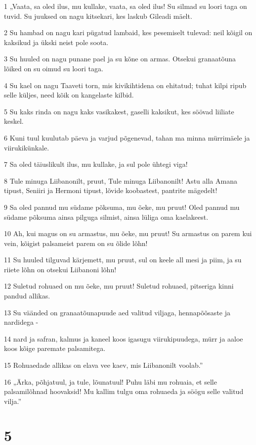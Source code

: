 \par 1 „Vaata, sa oled ilus, mu kullake, vaata, sa oled ilus! Su silmad su loori taga on tuvid. Su juuksed on nagu kitsekari, kes laskub Gileadi mäelt.
\par 2 Su hambad on nagu kari pügatud lambaid, kes pesemiselt tulevad: neil kõigil on kaksikud ja ükski neist pole soota.
\par 3 Su huuled on nagu punane pael ja su kõne on armas. Otsekui granaatõuna lõiked on su oimud su loori taga.
\par 4 Su kael on nagu Taaveti torn, mis kivikihtidena on ehitatud; tuhat kilpi ripub selle küljes, need kõik on kangelaste kilbid.
\par 5 Su kaks rinda on nagu kaks vasikakest, gaselli kaksikut, kes söövad liiliate keskel.
\par 6 Kuni tuul kuulutab päeva ja varjud põgenevad, tahan ma minna mürrimäele ja viirukikünkale.
\par 7 Sa oled täiuslikult ilus, mu kullake, ja sul pole ühtegi viga!
\par 8 Tule minuga Liibanonilt, pruut, Tule minuga Liibanonilt! Astu alla Amana tipust, Seniiri ja Hermoni tipust, lõvide koobastest, pantrite mägedelt!
\par 9 Sa oled pannud mu südame põksuma, mu õeke, mu pruut! Oled pannud mu südame põksuma ainsa pilguga silmist, ainsa lüliga oma kaelakeest.
\par 10 Ah, kui magus on su armastus, mu õeke, mu pruut! Su armastus on parem kui vein, kõigist palsameist parem on su õlide lõhn!
\par 11 Su huuled tilguvad kärjemett, mu pruut, sul on keele all mesi ja piim, ja su riiete lõhn on otsekui Liibanoni lõhn!
\par 12 Suletud rohuaed on mu õeke, mu pruut! Suletud rohuaed, pitseriga kinni pandud allikas.
\par 13 Su väänded on granaatõunapuude aed valitud viljaga, hennapõõsaste ja nardidega -
\par 14 nard ja safran, kalmus ja kaneel koos igasugu viirukipuudega, mürr ja aaloe koos kõige paremate palsamitega.
\par 15 Rohuaedade allikas on elava vee kaev, mis Liibanonilt voolab.”
\par 16 „Ärka, põhjatuul, ja tule, lõunatuul! Puhu läbi mu rohuaia, et selle palsamilõhnad hoovaksid! Mu kallim tulgu oma rohuaeda ja söögu selle valitud vilja.”

\chapter{5}

